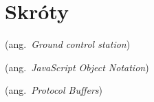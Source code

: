 \chapter*{Skróty}\mbox{}
\label{sec:skroty}
\noindent
\begin{description}[labelwidth=*]
  \item [GCS] (ang.\ \emph{Ground control station})
  \item [JSON] (ang.\ \emph{JavaScript Object Notation})
  \item [Protobuf] (ang.\ \emph{Protocol Buffers})
\end{description}

